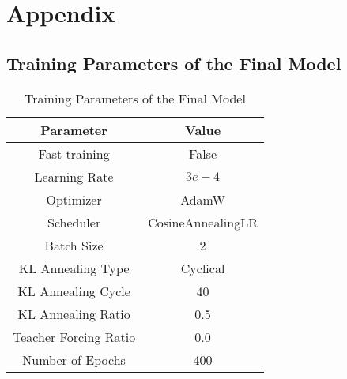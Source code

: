 \section{Appendix}

\subsection{Training Parameters of the Final Model}

\begin{table}[H]
    \centering
    \begin{tabular}{|c|c|}
        \hline
        Parameter & Value \\
        \hline
        Fast training & False \\
        Learning Rate & $3e-4$ \\
        Optimizer & AdamW \\
        Scheduler & CosineAnnealingLR \\
        Batch Size & 2 \\
        KL Annealing Type & Cyclical \\
        KL Annealing Cycle & 40 \\
        KL Annealing Ratio & 0.5 \\
        Teacher Forcing Ratio & 0.0 \\
        Number of Epochs & 400 \\
        \hline
    \end{tabular}
    \caption{Training Parameters of the Final Model} \label{tab:training_parameters}
\end{table}
